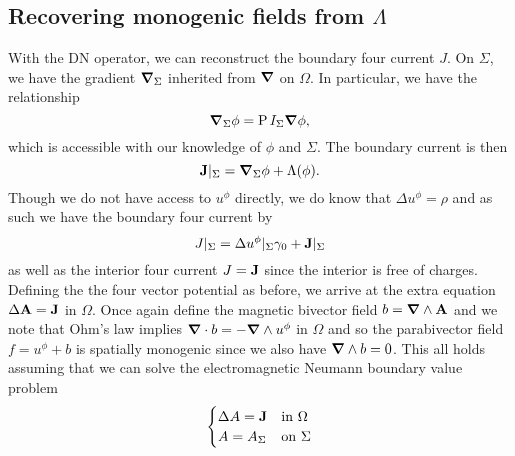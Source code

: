 \subsection{Recovering monogenic fields from $\Lambda$}

With the DN operator, we can reconstruct the boundary four current $J$.  On $\Sigma$, we have the gradient $\boldsymbol{\nabla}_\Sigma$ inherited from $\boldsymbol{\nabla}$ on $\Omega$.  In particular, we have the relationship
\[
\boldsymbol{\nabla}_\Sigma \phi = \operatorname{P}{I_\Sigma}{\boldsymbol{\nabla} \phi},
\]
which is accessible with our knowledge of $\phi$ and $\Sigma$. The boundary current is then
\[
\mathbf{J}\vert_{\Sigma} = \boldsymbol{\nabla}_\Sigma \phi + \Lambda(\phi).
\]
Though we do not have access to $u^\phi$ directly, we do know that $\Delta u^\phi = \rho$ and as such we have the boundary four current by
\[
J\vert_\Sigma = \Delta u^\phi\vert_\Sigma \gamma_0 + \mathbf{J}\vert_\Sigma
\]
as well as the interior four current $J = \mathbf{J}$ since the interior is free of charges.  Defining the the four vector potential as before, we arrive at the extra equation $\Delta \mathbf{A} = \mathbf{J}$ in $\Omega$. Once again define the magnetic bivector field $b=\boldsymbol{\nabla} \wedge \mathbf{A}$ and we note that Ohm's law implies $\boldsymbol{\nabla} \cdot b = -\boldsymbol{\nabla} \wedge u^\phi$ in $\Omega$ and so the parabivector field $f=u^\phi + b$ is spatially monogenic since we also have $\boldsymbol{\nabla} \wedge b = 0$.  This all holds assuming that we can solve the electromagnetic Neumann boundary value problem
\[
\begin{cases} \Delta A = \mathbf{J} & \textrm{in $\Omega$}\\ A = A_\Sigma & \textrm{on $\Sigma$} \end{cases}
\]


